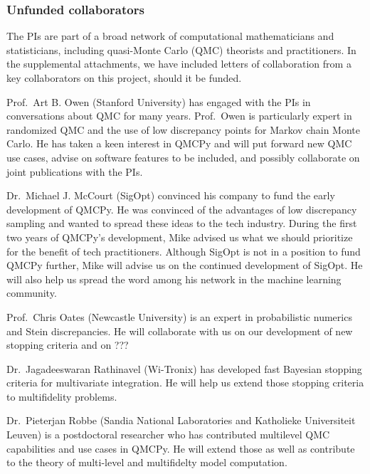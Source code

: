 \documentclass[11pt]{NSFamsart}
\begin{document}
\subsubsection*{Unfunded collaborators} The PIs are part of a broad network of computational mathematicians and statisticians, including quasi-Monte Carlo (QMC) theorists and practitioners.  In the supplemental attachments, we have included letters of collaboration from a key collaborators on this project, should it be funded.

Prof.\ Art B. Owen (Stanford University) has engaged with the PIs in conversations about QMC for many years.  Prof.\ Owen is particularly expert in randomized QMC and the use of low discrepancy points for Markov chain Monte Carlo.  He has taken a keen interest in QMCPy and will put forward new QMC use cases, advise on software features to be included, and possibly collaborate on joint publications with the PIs. 

Dr.\ Michael J. McCourt (SigOpt) convinced his company to fund the early development of QMCPy.  He was convinced of the advantages of low discrepancy sampling and wanted to spread these ideas to the tech industry.  During the first two years of QMCPy's development, Mike advised us what we should prioritize for the benefit of tech practitioners.  Although SigOpt is not in a position to fund QMCPy further, Mike will advise us on the continued development of SigOpt.  He will also help us spread the word among his network in the machine learning community.


Prof.\ Chris Oates (Newcastle University) is an expert in probabilistic numerics and Stein discrepancies.  He will collaborate with us on our development of new stopping criteria and on ???

Dr.\ Jagadeeswaran Rathinavel (Wi-Tronix) has developed fast Bayesian stopping criteria for multivariate integration.  He will help us extend those stopping criteria to multifidelity problems.

Dr.\ Pieterjan Robbe (Sandia National Laboratories and Katholieke Universiteit Leuven) is a postdoctoral researcher who has contributed multilevel QMC capabilities and use cases in QMCPy.  He will extend those as well as contribute to the theory of multi-level and multifidelty model computation.
\end{document}
